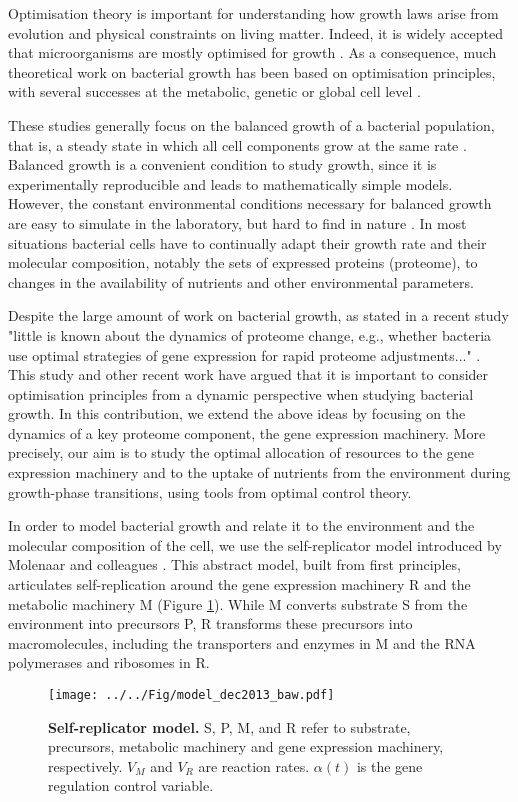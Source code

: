 \documentclass[a4paper, 10pt, conference]{ieeeconf}      %
\begin{document}
Optimisation theory is important for understanding how growth laws arise from evolution and physical constraints on living matter.
Indeed, it is widely accepted that microorganisms are mostly optimised for growth \cite{dekel_optimality_2005}.
As a consequence, much theoretical work on bacterial growth has been based on optimisation principles, with several successes at the metabolic, genetic or global cell level \cite{edwards_escherichia_2000, molenaar_shifts_2009}.

These studies generally focus on the balanced growth of a bacterial population, that is, a steady state in which all cell components grow at the same rate \cite{neidhardt_physiology_1990}.
Balanced growth is a convenient condition to study growth, since it is experimentally reproducible and leads to mathematically simple models.
However, the constant environmental conditions necessary for balanced growth are easy to simulate in the laboratory, but hard to find in nature \cite{neidhardt_physiology_1990}.
In most situations bacterial cells have to continually adapt their growth rate and their molecular composition, notably the sets of expressed proteins (proteome), to changes in the availability of nutrients and other environmental parameters.

Despite the large amount of work on bacterial growth, as stated in a recent study "little is known about the dynamics of proteome change, e.g., whether bacteria use optimal strategies of gene expression for rapid proteome adjustments..." \cite{pavlov_optimal_2013}.
This study and other recent work \cite{ehrenberg_medium-dependent_2013} have argued that it is important to consider optimisation principles from a dynamic perspective when studying bacterial growth.
In this contribution, we extend the above ideas by focusing on the dynamics of a key proteome component, the gene expression machinery.
More precisely, our aim is to study the optimal allocation of resources to the gene expression machinery and to the uptake of nutrients from the environment during growth-phase transitions, using tools from optimal control theory.

In order to model bacterial growth and relate it to the environment and the molecular composition of the cell, we use the self-replicator model introduced by Molenaar and colleagues \cite{molenaar_shifts_2009}.
This abstract model, built from first principles, articulates self-replication around the gene expression machinery R and the metabolic machinery M (Figure \ref{fig::selfrep}). While M converts substrate S from the environment into precursors P, R transforms these precursors into macromolecules, including the transporters and enzymes in M and the RNA polymerases and ribosomes in R.
\begin{figure}[h]
\centering
\texttt{[image: ../../Fig/model\_dec2013\_baw.pdf]}
\caption{\textbf{Self-replicator model.} S, P, M, and R refer to substrate, precursors, metabolic machinery and gene expression machinery, respectively.
$V_M$ and $V_R$ are reaction rates.
$\alpha(t)$ is the gene regulation control variable.
}
\label{fig::selfrep}
\end{figure}
\end{document}
